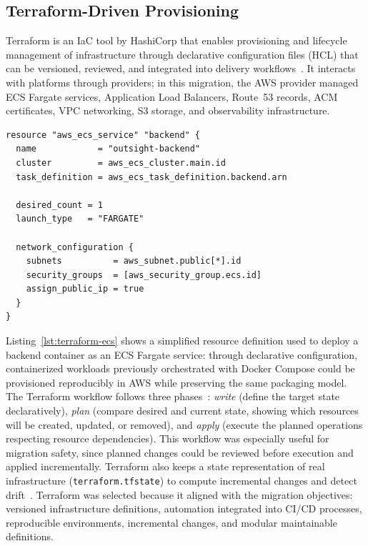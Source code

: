 \subsection{Terraform-Driven Provisioning}
Terraform is an IaC tool by HashiCorp that enables provisioning and lifecycle management of infrastructure through declarative configuration files (HCL) that can be versioned, reviewed, and integrated into delivery workflows~\cite{hashicorpTerraformIntro}. It interacts with platforms through providers; in this migration, the AWS provider managed ECS Fargate services, Application Load Balancers, Route~53 records, ACM certificates, VPC networking, S3 storage, and observability infrastructure.

\begin{lstlisting}[language={},caption={Simplified ECS Fargate service definition},label={lst:terraform-ecs}]
resource "aws_ecs_service" "backend" {
  name            = "outsight-backend"
  cluster         = aws_ecs_cluster.main.id
  task_definition = aws_ecs_task_definition.backend.arn

  desired_count = 1
  launch_type   = "FARGATE"

  network_configuration {
    subnets          = aws_subnet.public[*].id
    security_groups  = [aws_security_group.ecs.id]
    assign_public_ip = true
  }
}
\end{lstlisting}

Listing~\ref{lst:terraform-ecs} shows a simplified resource definition used to deploy a backend container as an ECS Fargate service: through declarative configuration, containerized workloads previously orchestrated with Docker Compose could be provisioned reproducibly in AWS while preserving the same packaging model. The Terraform workflow follows three phases~\cite{hashicorpTerraformIntro}: \emph{write} (define the target state declaratively), \emph{plan} (compare desired and current state, showing which resources will be created, updated, or removed), and \emph{apply} (execute the planned operations respecting resource dependencies). This workflow was especially useful for migration safety, since planned changes could be reviewed before execution and applied incrementally. Terraform also keeps a state representation of real infrastructure (\texttt{terraform.tfstate}) to compute incremental changes and detect drift~\cite{hashicorpTerraformIntro}. Terraform was selected because it aligned with the migration objectives: versioned infrastructure definitions, automation integrated into CI/CD processes, reproducible environments, incremental changes, and modular maintainable definitions.

